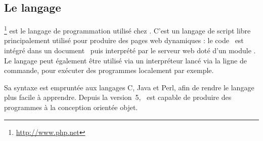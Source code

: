 \subsection{Le langage \aphp}

\aphp\footnote{\url{http://www.php.net}} est le langage de programmation utilisé chez \asl. C'est un langage de script libre principalement utilisé pour produire des pages web dynamiques : le code \aphp\ est intégré dans un document \ahtml\ puis interprété par le serveur web doté d'un module \aphp. Le langage peut également être utilisé via un interpréteur lancé via la ligne de commande, pour exécuter des programmes localement par exemple.

Sa syntaxe est empruntée aux langages C, Java et Perl, afin de rendre le langage plus facile à apprendre. Depuis la version~5, \aphp\ est capable de produire des programmes à la conception orientée objet.
